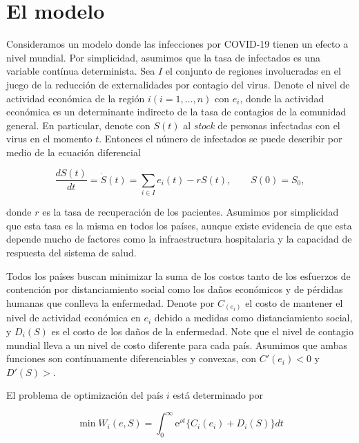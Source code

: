 \documentclass[11pt, oneside]{article}
\begin{document}
\section{El modelo}

Consideramos un modelo donde las infecciones por COVID-19 tienen un efecto a nivel mundial. Por simplicidad, asumimos que la tasa de infectados es una variable contínua determinista. Sea $I$ el conjunto de regiones involucradas en el juego de la reducción de externalidades por contagio del virus. Denote el nivel de actividad económica de la región $i (i = 1,\dots,n)$ con $e_i$, donde la actividad económica es un determinante indirecto de la tasa de contagios de la comunidad general. En particular, denote con $S(t)$ al \emph{stock} de personas infectadas con el virus en el momento $t$. Entonces el número de infectados se puede describir por medio de la ecuación diferencial 

\begin{equation}
	\frac{d S(t)}{dt} = \dot{S}(t) = \sum_{i \in I} e_i(t) - r S(t), \qquad S(0) = S_0,
\end{equation}

donde $r$ es la tasa de recuperación de los pacientes. Asumimos por simplicidad que esta tasa es la misma en todos los países, aunque existe evidencia de que esta depende mucho de factores como la infraestructura hospitalaria y la capacidad de respuesta del sistema de salud. 

Todos los países buscan minimizar la suma de los costos tanto de los esfuerzos de contención por distanciamiento social como los daños económicos y de pérdidas humanas que conlleva la enfermedad. Denote por $C_(e_i)$ el costo de mantener el nivel de actividad económica en $e_i$ debido a medidas como distanciamiento social, y $D_i(S)$ es el costo de los daños de la enfermedad. Note que el nivel de contagio mundial lleva a un nivel de costo diferente para cada país. Asumimos que ambas funciones son contínuamente diferenciables y convexas, con $C'(e_i) < 0$ y $D'(S) >$.

El problema de optimización del país $i$ está determinado por

\begin{equation}
	\min W_i(e,S) = \int_0^\infty \ensuremath{\mathrm{e}}^{\rho t}\{C_i(e_i) + D_i(S)\} dt
\end{equation}
\end{document}
